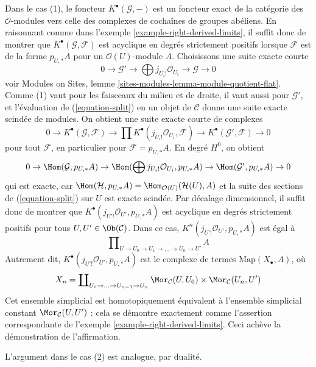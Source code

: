 \begin{example}
Dans le cas (1), le foncteur $K^\bullet(\mathcal{G}, -)$ est un foncteur exact
de la catégorie des $\mathcal{O}$-modules vers celle des complexes de
cochaînes de groupes abéliens. En raisonnant comme dans l'exemple
\ref{example-right-derived-limits}, il suffit donc de montrer que
$K^\bullet(\mathcal{G}, \mathcal{F})$ est acyclique en degrés strictement
positifs lorsque $\mathcal{F}$ est de la forme $p_{U, *}A$ pour un
$\mathcal{O}(U)$-module $A$.
Choisissons une suite exacte courte
\begin{equation}
\label{equation-split}
0 \to \mathcal{G}' \to \bigoplus j_{U_i!}\mathcal{O}_{U_i} \to
\mathcal{G} \to 0
\end{equation}
voir Modules on Sites, lemme
\ref{sites-modules-lemma-module-quotient-flat}. Comme (1) vaut pour les
faisceaux du milieu et de droite, il vaut aussi pour $\mathcal{G}'$, et
l'évaluation de (\ref{equation-split}) en un objet de $\mathcal{C}$ donne une
suite exacte scindée de modules. On obtient une suite exacte courte de
complexes
$$
0 \to
K^\bullet(\mathcal{G}, \mathcal{F}) \to
\prod K^\bullet(j_{U_i!}\mathcal{O}_{U_i}, \mathcal{F}) \to
K^\bullet(\mathcal{G}', \mathcal{F}) \to 0
$$
pour tout $\mathcal{F}$, en particulier pour
$\mathcal{F} = p_{U, *}A$. En degré $H^0$, on obtient
$$
0 \to \Hom(\mathcal{G}, p_{U, *}A) \to
\Hom(\bigoplus j_{U_i!}\mathcal{O}_{U_i}, p_{U, *}A) \to
\Hom(\mathcal{G}', p_{U, *}A) \to 0
$$
qui est exacte, car
$\Hom(\mathcal{H}, p_{U, *}A) = \Hom_{\mathcal{O}(U)}(\mathcal{H}(U), A)$
et la suite des sections de (\ref{equation-split}) sur $U$ est exacte
scindée. Par décalage dimensionnel, il suffit donc de montrer que
$K^\bullet(j_{U'!}\mathcal{O}_{U'}, p_{U, *}A)$ est acyclique en degrés
strictement positifs pour tous $U, U' \in \Ob(\mathcal{C})$. Dans ce cas,
$K^n(j_{U'!}\mathcal{O}_{U'}, p_{U, *}A)$ est égal à
$$
\prod\nolimits_{U \to U_0 \to U_1 \to \ldots \to U_n \to U'} A
$$
Autrement dit, $K^\bullet(j_{U'!}\mathcal{O}_{U'}, p_{U, *}A)$ est le
complexe de termes $\text{Map}(X_\bullet, A)$, où
$$
X_n = \coprod\nolimits_{U_0 \to \ldots \to U_{n - 1} \to U_n}
\Mor_\mathcal{C}(U, U_0) \times \Mor_\mathcal{C}(U_n, U')
$$
Cet ensemble simplicial est homotopiquement équivalent à l'ensemble
simplicial constant $\Mor_\mathcal{C}(U, U')$ : cela se démontre exactement
comme l'assertion correspondante de l'exemple
\ref{example-right-derived-limits}. Ceci achève la démonstration de
l'affirmation.

\medskip\noindent
L'argument dans le cas (2) est analogue, par dualité.
\end{example}






